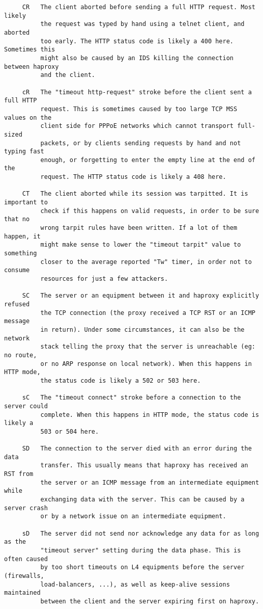 \begin{verbatim}
     CR   The client aborted before sending a full HTTP request. Most likely
          the request was typed by hand using a telnet client, and aborted
          too early. The HTTP status code is likely a 400 here. Sometimes this
          might also be caused by an IDS killing the connection between haproxy
          and the client.

     cR   The "timeout http-request" stroke before the client sent a full HTTP
          request. This is sometimes caused by too large TCP MSS values on the
          client side for PPPoE networks which cannot transport full-sized
          packets, or by clients sending requests by hand and not typing fast
          enough, or forgetting to enter the empty line at the end of the
          request. The HTTP status code is likely a 408 here.

     CT   The client aborted while its session was tarpitted. It is important to
          check if this happens on valid requests, in order to be sure that no
          wrong tarpit rules have been written. If a lot of them happen, it
          might make sense to lower the "timeout tarpit" value to something
          closer to the average reported "Tw" timer, in order not to consume
          resources for just a few attackers.

     SC   The server or an equipment between it and haproxy explicitly refused
          the TCP connection (the proxy received a TCP RST or an ICMP message
          in return). Under some circumstances, it can also be the network
          stack telling the proxy that the server is unreachable (eg: no route,
          or no ARP response on local network). When this happens in HTTP mode,
          the status code is likely a 502 or 503 here.

     sC   The "timeout connect" stroke before a connection to the server could
          complete. When this happens in HTTP mode, the status code is likely a
          503 or 504 here.

     SD   The connection to the server died with an error during the data
          transfer. This usually means that haproxy has received an RST from
          the server or an ICMP message from an intermediate equipment while
          exchanging data with the server. This can be caused by a server crash
          or by a network issue on an intermediate equipment.

     sD   The server did not send nor acknowledge any data for as long as the
          "timeout server" setting during the data phase. This is often caused
          by too short timeouts on L4 equipments before the server (firewalls,
          load-balancers, ...), as well as keep-alive sessions maintained
          between the client and the server expiring first on haproxy.


\end{verbatim}
